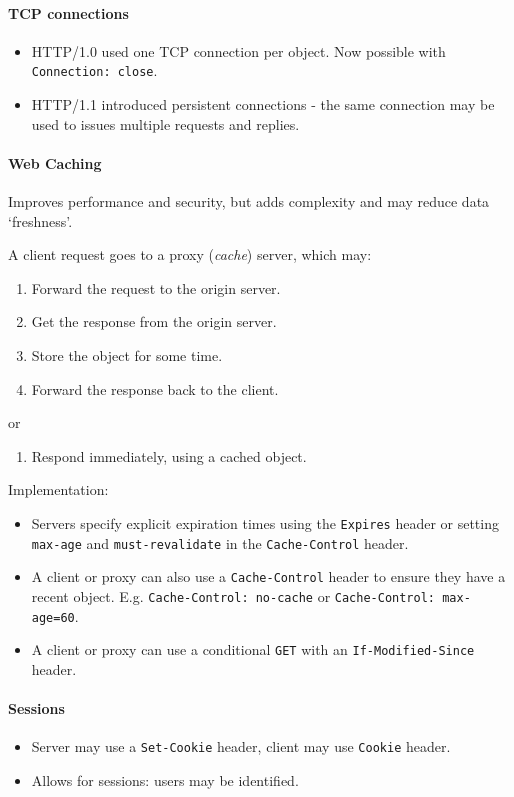 \documentclass[twocolumn,english]{article}
\begin{document}
\paragraph{TCP connections}
\begin{itemize}
\item HTTP/1.0 used one TCP connection per object. Now possible with \texttt{Connection: close}.
\item HTTP/1.1 introduced persistent connections - the same connection may
be used to issues multiple requests and replies.
\end{itemize}

\paragraph{Web Caching}

Improves performance and security, but adds complexity and may reduce
data `freshness'.

A client request goes to a proxy (\emph{cache}) server, which may:
\begin{enumerate}
\item Forward the request to the origin server.
\item Get the response from the origin server.
\item Store the object for some time.
\item Forward the response back to the client.
\end{enumerate}
or
\begin{enumerate}
\item Respond immediately, using a cached object.
\end{enumerate}
Implementation:
\begin{itemize}
\item Servers specify explicit expiration times using the \texttt{Expires}
header or setting \texttt{max-age} and \texttt{must-revalidate} in
the \texttt{Cache-Control} header.
\item A client or proxy can also use a \texttt{Cache-Control} header to
ensure they have a recent object. E.g. \texttt{Cache-Control: no-cache}
or \texttt{Cache-Control: max-age=60}.
\item A client or proxy can use a conditional \texttt{GET} with an \texttt{If-Modified-Since}
header.
\end{itemize}

\paragraph{Sessions}
\begin{itemize}
\item Server may use a \texttt{Set-Cookie} header, client may use \texttt{Cookie}
header.
\item Allows for sessions: users may be identified.
\end{itemize}
\end{document}
